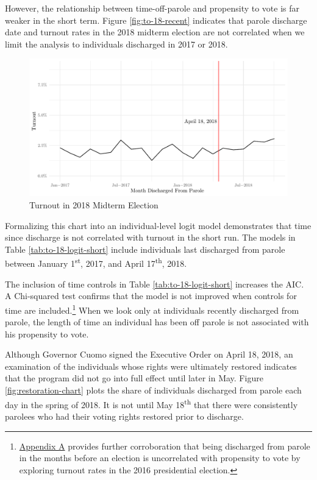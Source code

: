 \documentclass[]{article}
\let\rmarkdownfootnote\footnote%
\def\footnote{\protect\rmarkdownfootnote}
\begin{document}
However, the relationship between time-off-parole and propensity to vote is far weaker in the short term. Figure \ref{fig:to-18-recent} indicates that parole discharge date and turnout rates in the 2018 midterm election are not correlated when we limit the analysis to individuals discharged in 2017 or 2018.

\begin{figure}[H]

{\centering \includegraphics{felony_disenfranchisement_nys_files/figure-latex/to-18-recent-chart-1} 

}

\caption{\label{fig:to-18-recent}Turnout in 2018 Midterm Election}\label{fig:to-18-recent-chart}
\end{figure}

Formalizing this chart into an individual-level logit model demonstrates that time since discharge is not correlated with turnout in the short run. The models in Table \ref{tab:to-18-logit-short} include individuals last discharged from parole between January 1\textsuperscript{st}, 2017, and April 17\textsuperscript{th}, 2018.



The inclusion of time controls in Table \ref{tab:to-18-logit-short} increases the AIC. A Chi-squared test confirms that the model is not improved when controls for time are included.\footnote{\protect\hyperlink{appendix-a}{Appendix A} provides further corroboration that being discharged from parole in the months before an election is uncorrelated with propensity to vote by exploring turnout rates in the 2016 presidential election.} When we look only at individuals recently discharged from parole, the length of time an individual has been off parole is not associated with his propensity to vote.

Although Governor Cuomo signed the Executive Order on April 18, 2018, an examination of the individuals whose rights were ultimately restored indicates that the program did not go into full effect until later in May. Figure \ref{fig:restoration-chart} plots the share of individuals discharged from parole each day in the spring of 2018. It is not until May 18\textsuperscript{th} that there were consistently parolees who had their voting rights restored prior to discharge.
\end{document}
